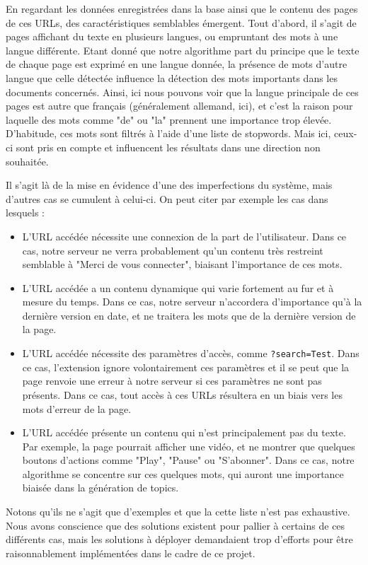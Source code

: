 				En regardant les données enregistrées dans la base ainsi que le contenu des pages de ces URLs, des caractéristiques semblables émergent. Tout d'abord, il s'agit de pages affichant du texte en plusieurs langues, ou empruntant des mots à une langue différente. Etant donné que notre algorithme part du principe que le texte de chaque page est exprimé en une langue donnée, la présence de mots d'autre langue que celle détectée influence la détection des mots importants dans les documents concernés. Ainsi, ici nous pouvons voir que la langue principale de ces pages est autre que français (généralement allemand, ici), et c'est la raison pour laquelle des mots comme "de" ou "la" prennent une importance trop élevée. D'habitude, ces mots sont filtrés à l'aide d'une liste de \gls{stopword}s. Mais ici, ceux-ci sont pris en compte et influencent les résultats dans une direction non souhaitée.

				Il s'agit là de la mise en évidence d'une des imperfections du système, mais d'autres cas se cumulent à celui-ci. On peut citer par exemple les cas dans lesquels :
				\begin{itemize}
					\item L'URL accédée nécessite une connexion de la part de l'utilisateur. Dans ce cas, notre serveur ne verra probablement qu'un contenu très restreint semblable à "Merci de vous connecter", biaisant l'importance de ces mots.
					\item L'URL accédée a un contenu dynamique qui varie fortement au fur et à mesure du temps. Dans ce cas, notre serveur n'accordera d'importance qu'à la dernière version en date, et ne traitera les mots que de la dernière version de la page.
					\item L'URL accédée nécessite des paramètres d'accès, comme \texttt{?search=Test}. Dans ce cas, l'extension ignore volontairement ces paramètres et il se peut que la page renvoie une erreur à notre serveur si ces paramètres ne sont pas présents. Dans ce cas, tout accès à ces URLs résultera en un biais vers les mots d'erreur de la page.
					\item L'URL accédée présente un contenu qui n'est principalement pas du texte. Par exemple, la page pourrait afficher une vidéo, et ne montrer que quelques boutons d'actions comme "Play", "Pause" ou "S'abonner". Dans ce cas, notre algorithme se concentre sur ces quelques mots, qui auront une importance biaisée dans la génération de topics. 
				\end{itemize}
				Notons qu'ils ne s'agit que d'exemples et que la cette liste n'est pas exhaustive. Nous avons conscience que des solutions existent pour pallier à certains de ces différents cas, mais les solutions à déployer demandaient trop d'efforts pour être raisonnablement implémentées dans le cadre de ce projet.

